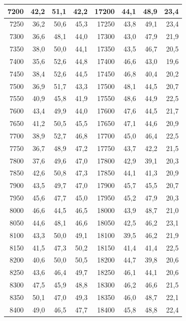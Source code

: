 \begin{small}
\begin{longtable}{|r|r|r|r|r|r|r|r|}
7200 & 42,2 & 51,1 & 42,2 & 17200 & 44,1 & 48,9 & 23,4 \\ \hline
7250 & 36,2 & 50,6 & 45,3 & 17250 & 43,8 & 49,1 & 23,4 \\ \hline
7300 & 36,6 & 48,1 & 44,0 & 17300 & 43,0 & 47,9 & 21,9 \\ \hline
7350 & 38,0 & 50,0 & 44,1 & 17350 & 43,5 & 46,7 & 20,5 \\ \hline
7400 & 35,6 & 52,6 & 44,8 & 17400 & 46,6 & 43,0 & 19,6 \\ \hline
7450 & 38,4 & 52,6 & 44,5 & 17450 & 46,8 & 40,4 & 20,2 \\ \hline
7500 & 36,9 & 51,7 & 43,3 & 17500 & 48,1 & 44,5 & 20,7 \\ \hline
7550 & 40,9 & 45,8 & 41,9 & 17550 & 48,6 & 44,9 & 22,5 \\ \hline
7600 & 43,4 & 49,9 & 44,0 & 17600 & 47,6 & 44,5 & 21,7 \\ \hline
7650 & 41,2 & 50,5 & 45,5 & 17650 & 47,1 & 44,6 & 20,9 \\ \hline
7700 & 38,9 & 52,7 & 46,8 & 17700 & 45,0 & 46,4 & 22,5 \\ \hline
7750 & 36,7 & 48,9 & 47,2 & 17750 & 43,7 & 42,2 & 21,5 \\ \hline
7800 & 37,6 & 49,6 & 47,0 & 17800 & 42,9 & 39,1 & 20,3 \\ \hline
7850 & 42,6 & 50,8 & 47,3 & 17850 & 44,1 & 41,3 & 20,9 \\ \hline
7900 & 43,5 & 49,7 & 47,0 & 17900 & 45,7 & 45,5 & 20,7 \\ \hline
7950 & 45,6 & 47,7 & 45,0 & 17950 & 45,2 & 47,9 & 20,3 \\ \hline
8000 & 46,6 & 44,5 & 46,5 & 18000 & 43,9 & 48,7 & 21,0 \\ \hline
8050 & 44,6 & 48,1 & 46,6 & 18050 & 42,5 & 46,2 & 23,1 \\ \hline
8100 & 43,3 & 50,0 & 49,1 & 18100 & 39,5 & 46,2 & 21,9 \\ \hline
8150 & 41,5 & 47,3 & 50,2 & 18150 & 41,4 & 41,4 & 22,5 \\ \hline
8200 & 40,6 & 50,0 & 50,5 & 18200 & 44,7 & 39,8 & 20,6 \\ \hline
8250 & 43,6 & 46,4 & 49,7 & 18250 & 46,1 & 44,1 & 20,6 \\ \hline
8300 & 47,5 & 45,9 & 48,8 & 18300 & 46,2 & 46,6 & 21,5 \\ \hline
8350 & 50,1 & 47,0 & 49,3 & 18350 & 46,0 & 48,7 & 22,1 \\ \hline
8400 & 49,0 & 46,5 & 47,7 & 18400 & 45,8 & 48,8 & 22,4 \\ \hline

\end{longtable}
\end{small}
